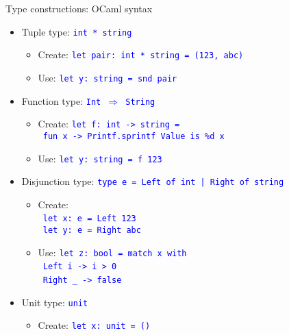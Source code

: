 \documentclass[english]{beamer}
\begin{document}
\begin{frame}{Type constructions: OCaml syntax}

\begin{itemize}
\item Tuple type: \texttt{\textcolor{blue}{\footnotesize{}int {*} string}}{\footnotesize \par}
\begin{itemize}
\item Create: \texttt{\textcolor{blue}{\footnotesize{}let pair:\ int {*}
string = (123, \textquotedbl{}abc\textquotedbl{})}} 
\item Use: \texttt{\textcolor{blue}{\footnotesize{}let y:\ string = snd
pair}}{\footnotesize \par}
\end{itemize}
\item Function type: \texttt{\textcolor{blue}{\footnotesize{}Int $\Rightarrow$
String}}{\footnotesize \par}
\begin{itemize}
\item Create: \texttt{\textcolor{blue}{\footnotesize{}let f:\ int -> string
=}}~\\
\texttt{\textcolor{blue}{\footnotesize{} fun x -> Printf.sprintf \textquotedbl{}Value
is \%d\textquotedbl{} x}} 
\item Use: \texttt{\textcolor{blue}{\footnotesize{}let y:\ string = f 123}}{\footnotesize \par}
\end{itemize}
\item Disjunction type: \texttt{\textcolor{blue}{\footnotesize{}type e =
Left of int | Right of string}}{\footnotesize \par}
\begin{itemize}
\item Create:\\
 \texttt{\textcolor{blue}{\footnotesize{}\ let x:\ e = Left 123}}~\\
\texttt{\textcolor{blue}{\footnotesize{} let y:\ e = Right \textquotedbl{}abc\textquotedbl{}}}{\footnotesize \par}
\item Use: \texttt{\textcolor{blue}{\footnotesize{}let z:\ bool = match
x with}}~\\
\texttt{\textcolor{blue}{\footnotesize{} Left i -> i > 0}}~\\
\texttt{\textcolor{blue}{\footnotesize{} Right \_ -> false}}~\\
{\footnotesize \par}
\end{itemize}
\item Unit type: \texttt{\textcolor{blue}{\footnotesize{}unit}}{\footnotesize \par}
\begin{itemize}
\item Create: \texttt{\textcolor{blue}{\footnotesize{}let x:\ unit = ()}}{\footnotesize \par}
\end{itemize}
\end{itemize}
\end{frame}
\end{document}
